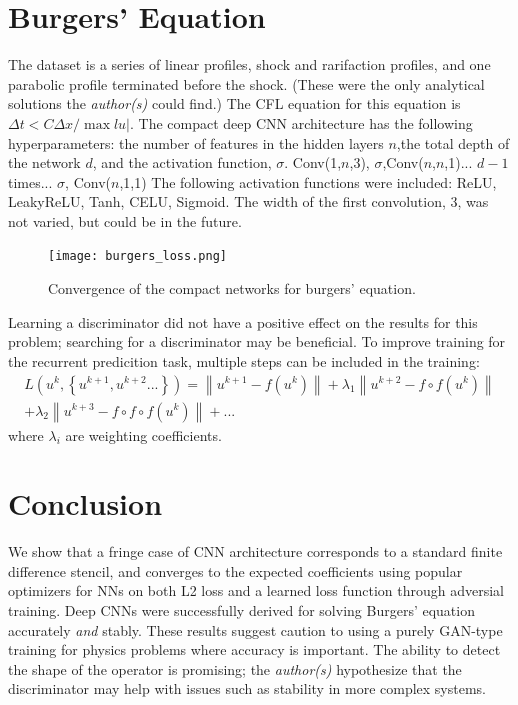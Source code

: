 \documentclass{article}
\begin{document}
\section{Burgers' Equation}

The dataset is a series of linear profiles, shock and rarifaction
profiles, and one parabolic profile terminated before the
shock. (These were the only analytical solutions the {\em author(s)}
could find.) The CFL equation for this equation is $\Delta t < C \Delta
x / \max lu|$. 
The compact deep CNN architecture has the following hyperparameters: the number of
features in the hidden layers $n$,the total depth of the network $d$,
and the activation function, $\sigma$.
Conv(1,$n$,3), $\sigma$,Conv($n$,$n$,1)... $d-1$ times... $\sigma$,
Conv($n$,1,1)
The following activation functions were included: ReLU, LeakyReLU, Tanh, CELU, Sigmoid.
The width of the first convolution, 3, was not varied, but could be in
the future.

\begin{figure}
  \centering
  \texttt{[image: burgers\_loss.png]}
  \caption{Convergence of the compact networks for burgers' equation.}
\end{figure}


Learning a discriminator did not have a positive effect on the
results for this problem; searching for a discriminator may be
beneficial. To improve training for the recurrent predicition task,
multiple steps can be included in the training:
\begin{eqnarray}
L\left(u^k,\left\{u^{k+1},u^{k+2}...\right\}\right) =  \left\| u^{k+1}-f(u^k) \right\| + \lambda_1  \left\| u^{k+2}-f \circ f(u^k) \right\| \nonumber \\+ \lambda_2  \left\| u^{k+3}-f \circ f \circ f(u^k) \right\| + ...
\end{eqnarray}
where $\lambda_i$ are weighting coefficients.


\section{Conclusion}
\label{sec:conclusion}

We show that a fringe case of CNN architecture corresponds to a standard finite difference stencil, and converges to the expected coefficients using popular optimizers for NNs on both L2 loss and a learned loss function through adversial training.
Deep CNNs were successfully derived for solving Burgers' equation accurately {\em and } stably.
These results suggest caution to using a purely GAN-type training for physics problems where accuracy is important. The ability to detect the shape of the operator is promising; the {\em author(s)} hypothesize that the discriminator may help with issues such as stability in more complex systems.
\end{document}
